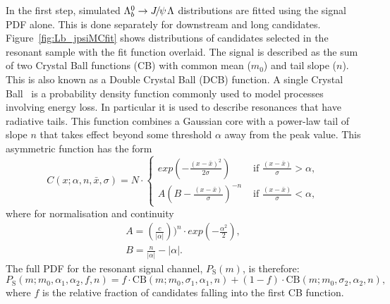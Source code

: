 In the first step, simulated $\Lb\to\jpsi\Lz$ distributions are fitted using the signal PDF alone.
This is done separately for downstream and long candidates. Figure~\ref{fig:Lb_jpsiMCfit} shows 
distributions of candidates selected in the resonant sample with the fit function overlaid.
%
The signal is described as the sum of two Crystal Ball functions (CB) with
common mean ($m_0$) and tail slope ($n$). This is also known as a Double Crystal Ball (DCB) function.
A single Crystal Ball~\cite{Skwarnicki:1986xj} is a probability
density function commonly used to model processes involving energy loss. In particular it is used
to describe resonances that have radiative tails. This function 
combines a Gaussian core with a power-law tail of slope $n$ that takes effect beyond some 
threshold $\alpha$ away from the peak value. This asymmetric function has the form
%
\begin{equation}
C(x;\alpha,n,\bar{x},\sigma) = N \cdot
\begin{cases}
exp \left( -\frac{(x - \bar{x})^2}{2\sigma} \right)  & \mbox{   if   } \frac{(x - \bar{x})}{\sigma} > \alpha, \\
A\left( B - \frac{(x - \bar{x})}{\sigma} \right)^{-n} & \mbox{   if   } \frac{(x - \bar{x})}{\sigma} < \alpha,
\end{cases}
\end{equation}
%
where for normalisation and continuity
%
\begin{equation}
\label{CB}
\begin{array}{ll}
A = \left( \frac{c}{|\alpha|} \right))^n \cdot exp(- \frac{\alpha^2}{2}), \\
B = \frac{n}{|\alpha|} - |\alpha|.
\end{array}
\end{equation}
%
The full PDF for the resonant signal channel,  $P_\mathrm{S}(m)$, is therefore:
%
\begin{equation}
P_\mathrm{S}(m;m_0,\alpha_1,\alpha_2,f,n) = f \cdot \text{CB}(m;m_0,\sigma_1,\alpha_1,n)+(1-f) \cdot \text{CB}(m;m_0,\sigma_2,\alpha_2,n),
\end{equation}
%
where $f$ is the relative fraction of candidates falling into the first CB function.

